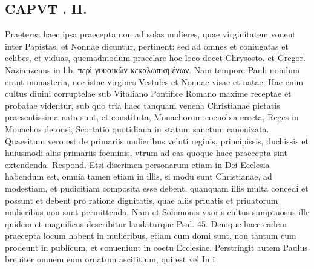 \documentclass{article}
\begin{document}
\begin{pages}
\section*{CAPVT . II. }
\marginpar{[ p.79 ]}\pstart Praeterea haec ipsa praecepta non ad solas mulieres, quae virginitatem vouent inter Papistas, et Nonnae dicuntur, pertinent: sed ad omnes et coniugatas et celibes, et viduas, quemadmodum praeclare hoc loco docet Chrysosto. et Gregor. Nazianzenus in lib.  περὶ γυυαικῶν κεκαλωπισμένων. Nam tempore Pauli nondum erant monasteria, nec istae virgines Vestales et Nonnae visae et natae. Hae enim cultus diuini corruptelae sub Vitaliano Pontifice Romano maxime receptae et probatae videntur, sub quo tria haec tanquam venena Christianae pietatis praesentissima nata sunt, et constituta, Monachorum coenobia erecta, Reges in Monachos detonsi, Scortatio quotidiana in statum sanctum canonizata. Quaesitum vero est de primariis mulieribus veluti reginis, principissis, duchissis et huiusmodi aliis primariis foeminis, vtrum ad eas quoque haec praecepta sint extendenda. Respond. Etsi discrimen personarum etiam in Dei Ecclesia habendum est, omnia tamen etiam in illis, si modu sunt Christianae, ad modestiam, et pudicitiam composita esse debent, quanquam illis multa concedi et possunt et debent pro ratione dignitatis, quae aliis priuatis et priuatorum mulieribus non sunt permittenda. Nam et Solomonis vxoris cultus sumptuosus ille quidem et magnificus describitur laudaturque Psal. 45. Denique haec eadem praecepta locum habent in mulieribus, etiam cum domi sunt, non tantum cum prodeunt in publicum, et conueniunt in coetu Ecclesiae. Perstringit autem Paulus breuiter omnem eum ornatum ascititium, qui est vel In i\pend

\end{pages}
\end{document}
